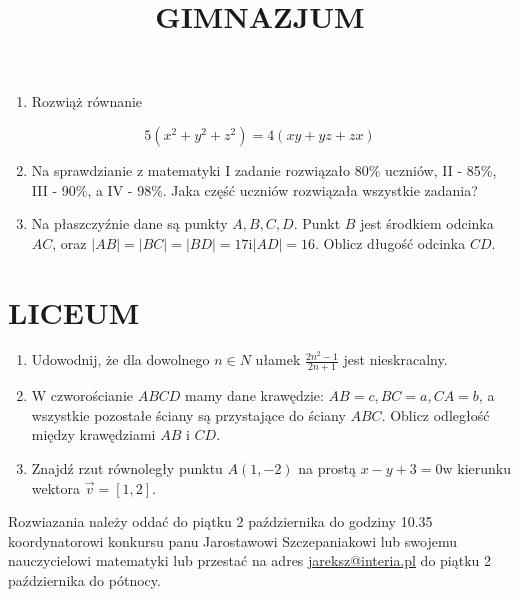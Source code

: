 \documentclass[10pt]{article}
\title{GIMNAZJUM }
\author{}
\date{}
\begin{document}
\maketitle
\begin{enumerate}
  \item Rozwiąż równanie
\end{enumerate}

\[
5\left(x^{2}+y^{2}+z^{2}\right)=4(x y+y z+z x)
\]

\begin{enumerate}
  \setcounter{enumi}{1}
  \item Na sprawdzianie z matematyki I zadanie rozwiązało \(80 \%\) uczniów, II - 85\%, III - 90\%, a IV - 98\%. Jaka część uczniów rozwiązała wszystkie zadania?
  \item Na płaszczyźnie dane są punkty \(A, B, C, D\). Punkt \(B\) jest środkiem odcinka \(A C\), oraz \(|A B|=|B C|=|B D|=17 \mathrm{i}|A D|=16\). Oblicz długość odcinka \(C D\).
\end{enumerate}

\section*{LICEUM}
\begin{enumerate}
  \item Udowodnij, że dla dowolnego \(n \in N\) ułamek \(\frac{2 n^{2}-1}{2 n+1}\) jest nieskracalny.
  \item W czworościanie \(A B C D\) mamy dane krawędzie: \(A B=c, B C=a, C A=b\), a wszystkie pozostałe ściany są przystające do ściany \(A B C\). Oblicz odległość między krawędziami \(A B\) i \(C D\).
  \item Znajdź rzut równoległy punktu \(A(1,-2)\) na prostą \(x-y+3=0 \mathrm{w}\) kierunku wektora \(\vec{v}=[1,2]\).
\end{enumerate}

Rozwiazania należy oddać do piątku 2 października do godziny 10.35 koordynatorowi konkursu panu Jarostawowi Szczepaniakowi lub swojemu nauczycielowi matematyki lub przestać na adres \href{mailto:jareksz@interia.pl}{jareksz@interia.pl} do piątku 2 października do pótnocy.
\end{document}
